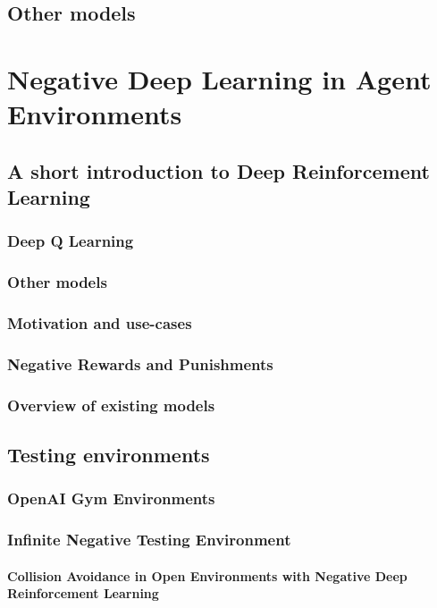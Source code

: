 \documentclass[b5paper]{book}
\begin{document}
\chapter{Other models}

\part{Negative Deep Learning in Agent Environments}

\chapter{A short introduction to Deep Reinforcement Learning}
\section{Deep Q Learning}
\section{Other models}

\section{Motivation and use-cases}
\section{Negative Rewards and Punishments}
\section{Overview of existing models}

\chapter{Testing environments}
\section{OpenAI Gym Environments}
\section{Infinite Negative Testing Environment}
\subsection{Collision Avoidance in Open Environments with Negative Deep Reinforcement Learning}
\end{document}
